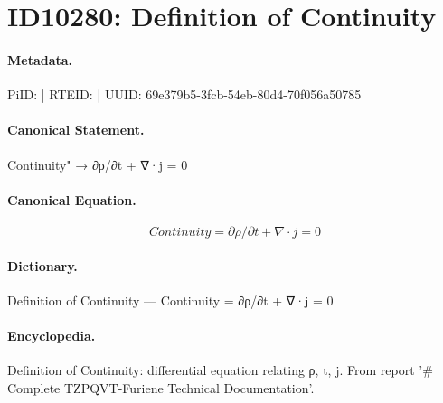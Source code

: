 \section*{ID10280: Definition of Continuity}
\paragraph{Metadata.}
PiID:  | RTEID:  | UUID: 69e379b5-3fcb-54eb-80d4-70f056a50785

\paragraph{Canonical Statement.}
Continuity" → ∂ρ/∂t + ∇·j = 0

\paragraph{Canonical Equation.}
\[
Continuity = ∂ρ/∂t + ∇·j = 0
\]

\paragraph{Dictionary.}
Definition of Continuity — Continuity = ∂ρ/∂t + ∇·j = 0

\paragraph{Encyclopedia.}
Definition of Continuity: differential equation relating ρ, t, j. From report '\# Complete TZPQVT-Furiene Technical Documentation'.
